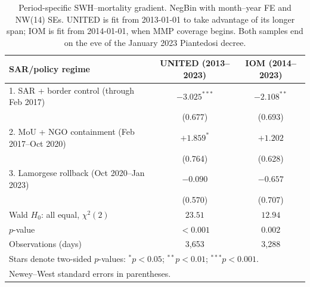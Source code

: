 \begin{table}[!htbp]
\centering
\small
\caption{Period-specific SWH--mortality gradient. NegBin with month--year FE and NW(14) SEs. UNITED is fit from 2013-01-01 to take advantage of its longer span; IOM is fit from 2014-01-01, when MMP coverage begins. Both samples end on the eve of the January 2023 Piantedosi decree.}
\label{tab:period}
\begin{tabular}{lcc}
\hline
SAR/policy regime                                & UNITED (2013--2023) & IOM (2014--2023) \\
\hline
1. SAR + border control (through Feb 2017)       & $-3.025^{***}$ & $-2.108^{**}$ \\
                                                 & (0.677) & (0.693) \\
2. MoU + NGO containment (Feb 2017--Oct 2020)    & $+1.859^{*}$ & $+1.202$ \\
                                                 & (0.764) & (0.628) \\
3. Lamorgese rollback (Oct 2020--Jan 2023)       & $-0.090$ & $-0.657$ \\
                                                 & (0.570) & (0.707) \\
\hline
Wald $H_{0}$: all equal, $\chi^{2}(2)$           & $23.51$ & $12.94$ \\
$p$-value                                        & $< 0.001$ & $0.002$ \\
Observations (days)                              & 3,653 & 3,288 \\
\hline
\multicolumn{3}{l}{\footnotesize Stars denote two-sided $p$-values: $^{*}p<0.05$; $^{**}p<0.01$; $^{***}p<0.001$.} \\
\multicolumn{3}{l}{\footnotesize Newey--West standard errors in parentheses.} \\
\end{tabular}
\end{table}

